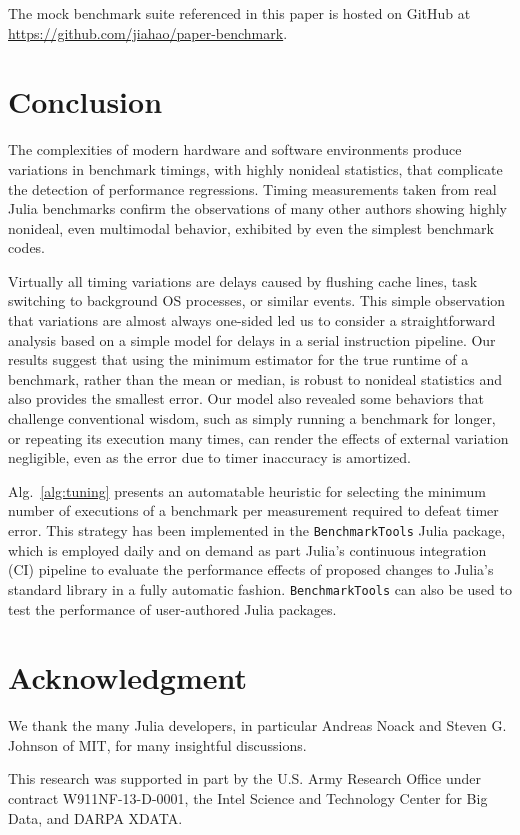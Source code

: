\documentclass[conference]{IEEEtran}
\begin{document}
The mock benchmark suite referenced in this paper is hosted on GitHub at
\url{https://github.com/jiahao/paper-benchmark}.

\section{Conclusion}
\label{sec:conclusion}

The complexities of modern hardware and software environments produce
variations in benchmark timings, with highly nonideal statistics, that
complicate the detection of performance regressions. Timing measurements taken
from real Julia benchmarks confirm the observations of many other authors
showing highly nonideal, even multimodal behavior, exhibited by even the
simplest benchmark codes.

Virtually all timing variations are delays caused by flushing cache lines, task
switching to background OS processes, or similar events. This simple
observation that variations are almost always one-sided led us to consider a
straightforward analysis based on a simple model for delays in a serial
instruction pipeline. Our results suggest that using the minimum estimator for
the true runtime of a benchmark, rather than the mean or median, is robust to
nonideal statistics and also provides the smallest error.  Our model also
revealed some behaviors that challenge conventional wisdom, such as simply
running a benchmark for longer, or repeating its execution many times, can
render the effects of external variation negligible, even as the error due to
timer inaccuracy is amortized.

Alg.~\ref{alg:tuning} presents an automatable heuristic for selecting the
minimum number of executions of a benchmark per measurement required to defeat
timer error. This strategy has been implemented in the
\lstinline|BenchmarkTools| Julia package, which is employed daily and on demand
as part Julia's continuous integration (CI) pipeline to evaluate the
performance effects of proposed changes to Julia's standard library in a fully
automatic fashion. \lstinline|BenchmarkTools| can also be used to test the
performance of user-authored Julia packages.


\section*{Acknowledgment}
\label{sec:acknowledgement}

We thank the many Julia developers, in particular Andreas Noack and Steven G.
Johnson of MIT, for many insightful discussions.

This research was supported in part by the U.S. Army Research Office under
contract W911NF-13-D-0001, the Intel Science and Technology Center for Big
Data, and DARPA XDATA.




\end{document}
